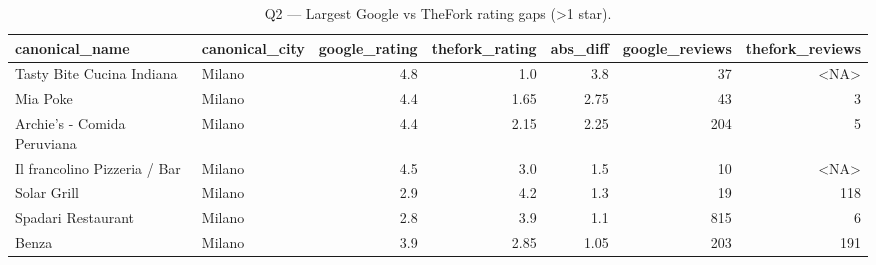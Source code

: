 \begin{table}[ht]
\centering
\caption{Q2 — Largest Google vs TheFork rating gaps (>1 star).}
\label{tab:q2_top_google_vs_thefork}
{\tiny
\begin{tabular}{llrrrrr}
\toprule
canonical\_name & canonical\_city & google\_rating & thefork\_rating & abs\_diff & google\_reviews & thefork\_reviews \\
\midrule
Tasty Bite Cucina Indiana & Milano & 4.8 & 1.0 & 3.8 & 37 & <NA> \\
Mia Poke & Milano & 4.4 & 1.65 & 2.75 & 43 & 3 \\
Archie’s - Comida Peruviana & Milano & 4.4 & 2.15 & 2.25 & 204 & 5 \\
Il francolino Pizzeria / Bar & Milano & 4.5 & 3.0 & 1.5 & 10 & <NA> \\
Solar Grill & Milano & 2.9 & 4.2 & 1.3 & 19 & 118 \\
Spadari Restaurant & Milano & 2.8 & 3.9 & 1.1 & 815 & 6 \\
Benza & Milano & 3.9 & 2.85 & 1.05 & 203 & 191 \\
\bottomrule
\end{tabular}
}
\end{table}
